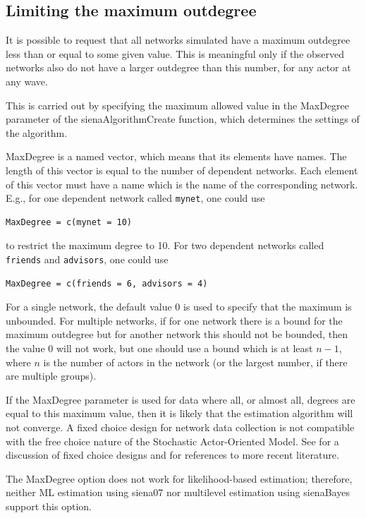 \documentclass[a4paper,fleqn,11pt]{article}
\newcommand{\+}{\, + \,}
\newcommand{\saom}{{Stochastic Actor-Oriented Model}}
\begin{document}
\subsection{Limiting the maximum outdegree}
\label{S_maxdegree}

It is possible to request that all networks simulated have a
maximum outdegree less than or equal to some given value.
This is meaningful only if the observed networks also do
not have a larger outdegree than this number, for any actor at any wave.

This is carried out by specifying the maximum allowed value
in the \textsf{MaxDegree} parameter of the \textsf{sienaAlgorithmCreate}
function, which determines the settings of the algorithm.

\textsf{MaxDegree} is a named vector, which means that its elements
have names. The length of this vector
is equal to the number of dependent networks.
Each element of this vector must have a name
which is the name of the corresponding network.
E.g., for one dependent network called \texttt{mynet}, one could use
\begin{verbatim}
MaxDegree = c(mynet = 10)
\end{verbatim}
to restrict the maximum degree to 10.
For two dependent networks called \texttt{friends} and \texttt{advisors},
one could use
\begin{verbatim}
MaxDegree = c(friends = 6, advisors = 4)
\end{verbatim}

For a single network, the default value 0 is used
to specify that the maximum is unbounded.
For multiple networks, if for one network
there is a bound for the maximum outdegree
 but for another network this should not be bounded, then
 the value 0 will not work,
 but one should use a bound which is at least $n-1$,
where $n$ is the number of actors in the network (or the largest number,
if there are multiple groups).

If the \textsf{MaxDegree} parameter is used for data where
all, or almost all, degrees are equal to this maximum value,
then it is likely that the estimation algorithm will not converge.
A fixed choice design for network data collection is not
compatible with the free choice nature of the \saom.
See \citet{HollandLeinhardt1973} for a discussion of
fixed choice designs and \citet{Znidarsic2012}
for references to more recent literature.

The \textsf{MaxDegree} option does not work for likelihood-based
estimation; therefore, neither ML estimation using \textsf{siena07}
nor multilevel estimation using \textsf{sienaBayes} support
this option.
\end{document}
